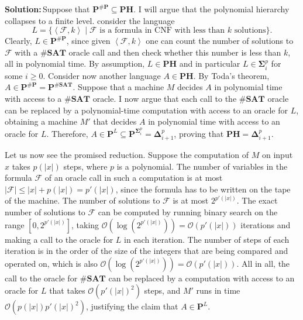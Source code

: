 \documentclass{amsart}
\theoremstyle{plain}
\theoremstyle{definition}
\newcommand{\p}{\textbf{P}}
\newcommand{\ph}{\textbf{PH}}
\newcommand{\sharpp}{\textbf{\#P}}
\newcommand{\sharpsat}{\textbf{\#SAT}}
\newcommand{\sol}{\textbf{Solution:\,}}
\begin{document}
\begin{enumerate}[label=\textbf{Exercise \arabic*:}, leftmargin=0cm, labelwidth=-0.2cm, align=left]
        \sol Suppose that $\p^{\sharpp} \subseteq \ph$.
        I will argue that the polynomial hierarchy collapses to a finite level.
        consider the language
        \[
            L = \{ \left< \mathcal{F}, k \right> \mid \mathcal{F} \text{ is a formula in CNF with less than } k \text{ solutions}\}.
        \]
        Clearly, $L \in \p^{\sharpp}$, since given $\left< \mathcal{F}, k \right>$ one
        can count the number of solutions to $\mathcal{F}$ with a $\sharpsat$ oracle
        call and then check whether this number is less than $k$, all in polynomial time.
        By assumption, $L \in \ph$ and in particular $L \in \mathbf{\Sigma}^p_i$ for some $i \geq 0$.
        Consider now another language $A \in \ph$.
        By Toda's theorem, $A \in \p^{\sharpp} = \p^{\sharpsat}$.
        Suppose that a machine $M$ decides $A$ in polynomial time with access to a $\sharpsat$ oracle.
        I now argue that each call to the $\sharpsat$ oracle can be replaced by a
        polynomial-time computation with access to an oracle for $L$,
        obtaining a machine $M'$ that decides $A$ in polynomial time with access to an oracle for $L$.
        Therefore, $A \in \p^{L} \subseteq \p^{\mathbf{\Sigma}^p_i} = \mathbf{\Delta}^p_{i+1}$, proving that $\ph = \mathbf{\Delta}^p_{i+1}$.

        Let us now see the promised reduction.
        Suppose the computation of $M$ on input $x$ takes $p(|x|)$ steps,
        where $p$ is a polynomial.
        The number of variables in the formula $\mathcal{F}$ of an oracle call
        in such a computation is at most $|\mathcal{F}| \leq |x| + p(|x|) = p'(|x|)$,
        since the formula has to be written on the tape of the machine.
        The number of solutions to $\mathcal{F}$ is at most $2^{p'(|x|)}$.
        The exact number of solutions to $\mathcal{F}$ can be computed
        by running binary search on the range $[0, 2^{p'(|x|)}]$,
        taking $\mathcal{O}(\log(2^{p'(|x|)})) = \mathcal{O}(p'(|x|))$ iterations
        and making a call to the oracle for $L$ in each iteration.
        The number of steps of each iteration is in the order of the size of the integers that are being compared and operated on,
        which is also $\mathcal{O}\left(\log(2^{p'(|x|)})\right) = \mathcal{O}\left(p'(|x|)\right)$.
        All in all, the call to the oracle for $\sharpsat$ can be replaced by a computation
        with access to an oracle for $L$ that takes $\mathcal{O}\left(p'(|x|)^2\right)$ steps,
        and $M'$ runs in time $\mathcal{O} \left( p(|x|) p'(|x|)^2 \right)$,
        justifying the claim that $A \in \p^{L}$.

    \end{enumerate}
\end{document}
